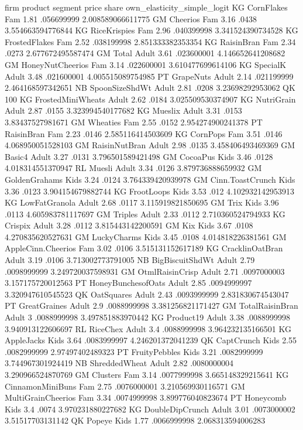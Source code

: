 firm	product	segment	price	share	own_elasticity_simple_logit
KG	CornFlakes	Fam	1.81	.056699999	2.008589066611775
GM	Cheerios	Fam	3.16	.0438	3.554663594776844
KG	RiceKrispies	Fam	2.96	.040399998	3.341524390734528
KG	FrostedFlakes	Fam	2.52	.038199998	2.851333382353354
KG	RaisinBran	Fam	2.34	.0273	2.677672495587474
GM	Total	Adult	3.61	.023600001	4.146652641208682
GM	HoneyNutCheerios	Fam	3.14	.022600001	3.610477699614106
KG	SpecialK	Adult	3.48	.021600001	4.005515089754985
PT	GrapeNuts	Adult	2.14	.021199999	2.464168597342651
NB	SpoonSizeShdWt	Adult	2.81	.0208	3.23698292953062
QK	100%
KG	FrostedMiniWheats	Adult	2.62	.0184	3.025509530374907
KG	NutriGrain	Adult	2.87	.0155	3.323994540177682
KG	Mueslix	Adult	3.31	.0153	3.83437527981671
GM	Wheaties	Fam	2.55	.0152	2.954274900241378
PT	RaisinBran	Fam	2.23	.0146	2.585116414503609
KG	CornPops	Fam	3.51	.0146	4.068950051528103
GM	RaisinNutBran	Adult	2.98	.0135	3.458406493469369
GM	Basic4	Adult	3.27	.0131	3.796501589421498
GM	CocoaPus	Kids	3.46	.0128	4.018314551370947
RL	Muesli	Adult	3.34	.0126	3.879736888659932
GM	GoldenGrahams	Kids	3.24	.0124	3.764339420939978
GM	Cinn.ToastCrunch	Kids	3.36	.0123	3.904154679882744
KG	FrootLoops	Kids	3.53	.012	4.102932142953913
KG	LowFatGranola	Adult	2.68	.0117	3.115919821850695
GM	Trix	Kids	3.96	.0113	4.605983781117697
GM	Triples	Adult	2.33	.0112	2.710360524794933
KG	Crispix	Adult	3.28	.0112	3.815443142200591
GM	Kix	Kids	3.67	.0108	4.270835620527631
GM	LuckyCharms	Kids	3.45	.0108	4.014818226381561
GM	AppleCinn.Cheerios	Fam	3.02	.0106	3.515131152617189
KG	CracklinOatBran	Adult	3.19	.0106	3.713002773791005
NB	BigBiscuitShdWt	Adult	2.79	.0098999999	3.249720037598931
GM	OtmlRaisinCrisp	Adult	2.71	.0097000003	3.157175720012563
PT	HoneyBunchesofOats	Adult	2.85	.0094999997	3.320947610545523
QK	OatSquares	Adult	2.43	.0093999999	2.831830674543047
PT	GreatGraines	Adult	2.9	.0088999998	3.381256821171427
GM	TotalRaisinBran	Adult	3	.0088999998	3.497851883970442
KG	Product19	Adult	3.38	.0088999998	3.940913122606697
RL	RiceChex	Adult	3.4	.0088999998	3.964232135166501
KG	AppleJacks	Kids	3.64	.0083999997	4.246201372041239
QK	CaptCrunch	Kids	2.55	.0082999999	2.97497402489323
PT	FruityPebbles	Kids	3.21	.0082999999	3.744967301924419
NB	ShreddedWheat	Adult	2.82	.0080000004	3.290966524870769
GM	Clusters	Fam	3.14	.0077999998	3.665148329215641
KG	CinnamonMiniBuns	Fam	2.75	.0076000001	3.210569930116571
GM	MultiGrainCheerios	Fam	3.34	.0074999998	3.899776040823674
PT	Honeycomb	Kids	3.4	.0074	3.970231880227682
KG	DoubleDipCrunch	Adult	3.01	.0073000002	3.51517703131142
QK	Popeye	Kids	1.77	.0066999998	2.068313594006283
